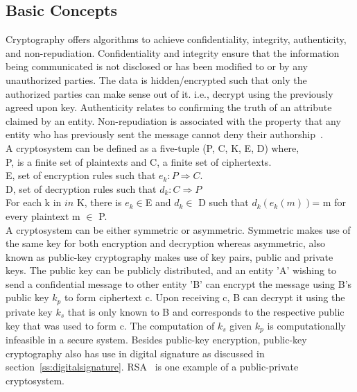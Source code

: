 \subsection{Basic Concepts}
Cryptography offers algorithms to achieve confidentiality, integrity,
authenticity, and non-repudiation. Confidentiality and integrity ensure that
the information being communicated is not disclosed or has been modified to or
by any unauthorized parties. The data is hidden/encrypted such that only the
authorized parties can make sense out of it. i.e., decrypt using the previously
agreed upon key. Authenticity relates to confirming the truth of an attribute
claimed by an entity. Non-repudiation is associated with the property that any
entity who has previously sent the message cannot deny their
authorship~\cite{katz1996handbook}. \\ 
A cryptosystem can be defined as a five-tuple (P, C, K, E, D) where, \\
P, is a finite set of plaintexts and C, a finite set of ciphertexts. \\
E, set of encryption rules such that $e_{k}:P \Rightarrow C $. \\ 
D, set of decryption rules such that $d_{k}:C \Rightarrow P$\\ 
For each k in $in$ K, there is $e_{k } \in$E and $d_{k } \in$ D such that
$d_{k}(e_{k}(m))$= m for every plaintext m $\in$ P.\\
A cryptosystem can be either symmetric or asymmetric. Symmetric makes use of
the same key for both encryption and decryption whereas asymmetric, also known
as public-key cryptography makes use of key pairs, public and private keys. The
public key can be publicly distributed, and an entity 'A' wishing to send a
confidential message to other entity 'B' can encrypt the message using B's
public key $k_{p}$ to form ciphertext c. Upon receiving c, B can decrypt it
using the private key $k_{s}$ that is only known to B and corresponds to the
respective public key that was used to form c. The computation of $k_{s}$ given
$k_{p}$ is computationally infeasible in a secure system. Besides public-key
encryption, public-key cryptography also has use in digital signature as
discussed in section~\ref{ss:digitalsignature}. RSA~\cite{rivest1978method} is
one example of a public-private cryptosystem.



